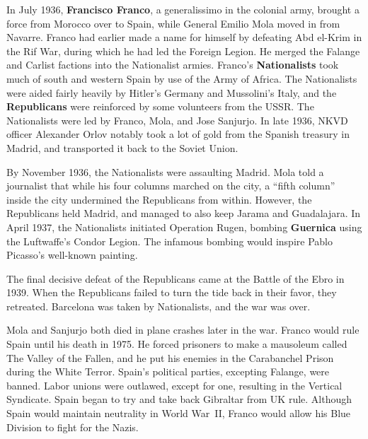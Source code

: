 In July 1936, \textbf{Francisco Franco}, a generalissimo in the colonial army,
brought a force from Morocco over to Spain, while General Emilio Mola moved in from Navarre.
Franco had earlier made a name for himself by defeating Abd el-Krim in the Rif War,
during which he had led the Foreign Legion.
He merged the Falange and Carlist factions into the Nationalist armies.
Franco's \textbf{Nationalists} took much of south and western Spain by use of the Army of Africa.
The Nationalists were aided fairly heavily by Hitler's Germany and Mussolini's Italy,
and the \textbf{Republicans} were reinforced by some volunteers from the USSR\@.
The Nationalists were led by Franco, Mola, and Jose Sanjurjo.
In late 1936,
NKVD officer Alexander Orlov notably took a lot of gold from the Spanish treasury in Madrid,
and transported it back to the Soviet Union.

By November 1936, the Nationalists were assaulting Madrid.
Mola told a journalist that while his four columns marched on the city,
a ``fifth column'' inside the city undermined the Republicans from within.
However, the Republicans held Madrid, and managed to also keep Jarama and Guadalajara.
In April 1937, the Nationalists initiated Operation Rugen,
bombing \textbf{Guernica} using the Luftwaffe's Condor Legion.
The infamous bombing would inspire Pablo Picasso's well-known painting.

The final decisive defeat of the Republicans came at the Battle of the Ebro in 1939.
When the Republicans failed to turn the tide back in their favor, they retreated.
Barcelona was taken by Nationalists, and the war was over.

Mola and Sanjurjo both died in plane crashes later in the war.
Franco would rule Spain until his death in 1975.
He forced prisoners to make a mausoleum called The Valley of the Fallen,
and he put his enemies in the Carabanchel Prison during the White Terror.
Spain's political parties, excepting Falange, were banned.
Labor unions were outlawed, except for one, resulting in the Vertical Syndicate.
Spain began to try and take back Gibraltar from UK rule.
Although Spain would maintain neutrality in World War~II,
Franco would allow his Blue Division to fight for the Nazis.

